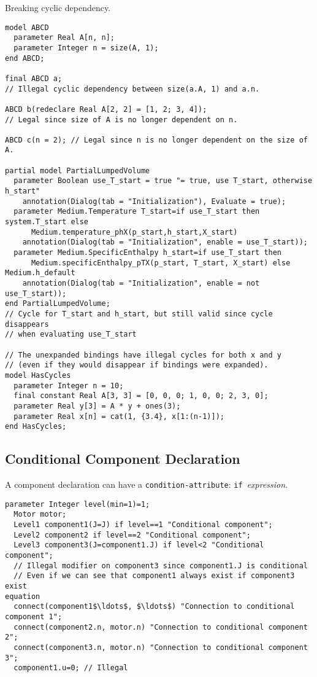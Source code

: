\begin{example}
Breaking cyclic dependency.
\begin{lstlisting}[language=modelica]
model ABCD
  parameter Real A[n, n];
  parameter Integer n = size(A, 1);
end ABCD;

final ABCD a;
// Illegal cyclic dependency between size(a.A, 1) and a.n.

ABCD b(redeclare Real A[2, 2] = [1, 2; 3, 4]);
// Legal since size of A is no longer dependent on n.

ABCD c(n = 2); // Legal since n is no longer dependent on the size of A.

partial model PartialLumpedVolume
  parameter Boolean use_T_start = true "= true, use T_start, otherwise h_start"
    annotation(Dialog(tab = "Initialization"), Evaluate = true);
  parameter Medium.Temperature T_start=if use_T_start then system.T_start else
      Medium.temperature_phX(p_start,h_start,X_start)
    annotation(Dialog(tab = "Initialization", enable = use_T_start));
  parameter Medium.SpecificEnthalpy h_start=if use_T_start then
      Medium.specificEnthalpy_pTX(p_start, T_start, X_start) else Medium.h_default
    annotation(Dialog(tab = "Initialization", enable = not use_T_start));
end PartialLumpedVolume;
// Cycle for T_start and h_start, but still valid since cycle disappears
// when evaluating use_T_start

// The unexpanded bindings have illegal cycles for both x and y
// (even if they would disappear if bindings were expanded).
model HasCycles
  parameter Integer n = 10;
  final constant Real A[3, 3] = [0, 0, 0; 1, 0, 0; 2, 3, 0];
  parameter Real y[3] = A * y + ones(3);
  parameter Real x[n] = cat(1, {3.4}, x[1:(n-1)]);
end HasCycles;
\end{lstlisting}
\end{example}


\subsection{Conditional Component Declaration}\label{conditional-component-declaration}

A component declaration can have a \lstinline!condition-attribute!: \lstinline!if!~\emph{expression}.

\begin{example}
\begin{lstlisting}[language=modelica]
  parameter Integer level(min=1)=1;
  Motor motor;
  Level1 component1(J=J) if level==1 "Conditional component";
  Level2 component2 if level==2 "Conditional component";
  Level3 component3(J=component1.J) if level<2 "Conditional component";
  // Illegal modifier on component3 since component1.J is conditional
  // Even if we can see that component1 always exist if component3 exist
equation
  connect(component1$\ldots$, $\ldots$) "Connection to conditional component 1";
  connect(component2.n, motor.n) "Connection to conditional component 2";
  connect(component3.n, motor.n) "Connection to conditional component 3";
  component1.u=0; // Illegal
\end{lstlisting}
\end{example}


